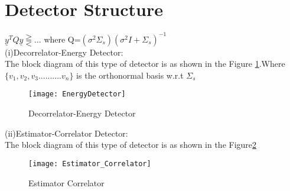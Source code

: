 \documentclass[12pt]{report}
\begin{document}
\noindent \section{Detector Structure} $\underline{y}^TQ\underline{y}\gtreqqless\ldots$
\noindent  where  Q=$(\sigma^2\Sigma_s)(\sigma^2I+\Sigma_s)^{-1}$\\

\noindent (i)Decorrelator-Energy Detector:\\
\noindent The block diagram of this type of detector is as shown in the Figure \ref{fig:energydetector}.Where $ \{v_1,v_2,v_3..........v_n\} $ is the orthonormal basis w.r.t $ \Sigma_s $\\
		\begin{figure}%
		\centering
		\scalebox{0.65}
		{\texttt{[image: EnergyDetector]}}\\
			\caption{Decorrelator-Energy Detector}
		\label{fig:energydetector}
	\end{figure}

\noindent (ii)Estimator-Correlator Detector:\\
\noindent The block diagram of this type of detector is as shown in the Figure\ref{fig:EstCorrelator}
	
	\begin{figure}%
		\centering
		\scalebox{0.60}
		{\texttt{[image: Estimator\_Correlator]}}\\
			\caption{Estimator Correlator}
		\label{fig:EstCorrelator}
		
		
		
	\end{figure}



	
\end{document}
